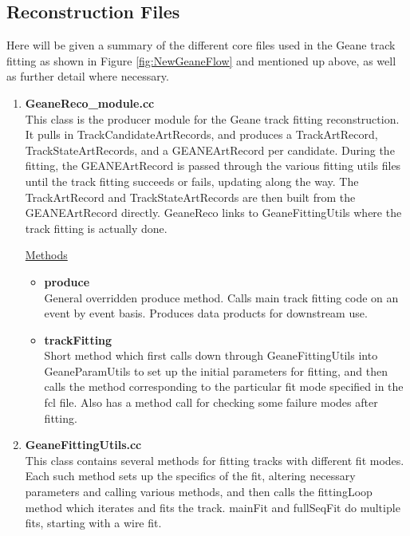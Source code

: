   \subsection{Reconstruction Files}

    Here will be given a summary of the different core files used in the Geane track fitting as shown in Figure \ref{fig:NewGeaneFlow} and mentioned up above, as well as further detail where necessary. 


    \begin{enumerate}

      \item{\bf{GeaneReco\_module.cc}} \\
      This class is the producer module for the Geane track fitting reconstruction. It pulls in TrackCandidateArtRecords, and produces a TrackArtRecord, TrackStateArtRecords, and a GEANEArtRecord per candidate. During the fitting, the GEANEArtRecord is passed through the various fitting utils files until the track fitting succeeds or fails, updating along the way. The TrackArtRecord and TrackStateArtRecords are then built from the GEANEArtRecord directly. GeaneReco links to GeaneFittingUtils where the track fitting is actually done.

      \underline{Methods}

        \begin{itemize}

          \item{\bf{produce}} \\
          General overridden produce method. Calls main track fitting code on an event by event basis. Produces data products for downstream use.

          \item{\bf{trackFitting}} \\ 
          Short method which first calls down through GeaneFittingUtils into GeaneParamUtils to set up the initial parameters for fitting, and then calls the method corresponding to the particular fit mode specified in the fcl file. Also has a method call for checking some failure modes after fitting.

        \end{itemize}

      \item{\bf{GeaneFittingUtils.cc}} \\
      \label{sec:GeaneFittingUtils}
      This class contains several methods for fitting tracks with different fit modes. Each such method sets up the specifics of the fit, altering necessary parameters and calling various methods, and then calls the fittingLoop method which iterates and fits the track. mainFit and fullSeqFit do multiple fits, starting with a wire fit. 


\end{enumerate}
